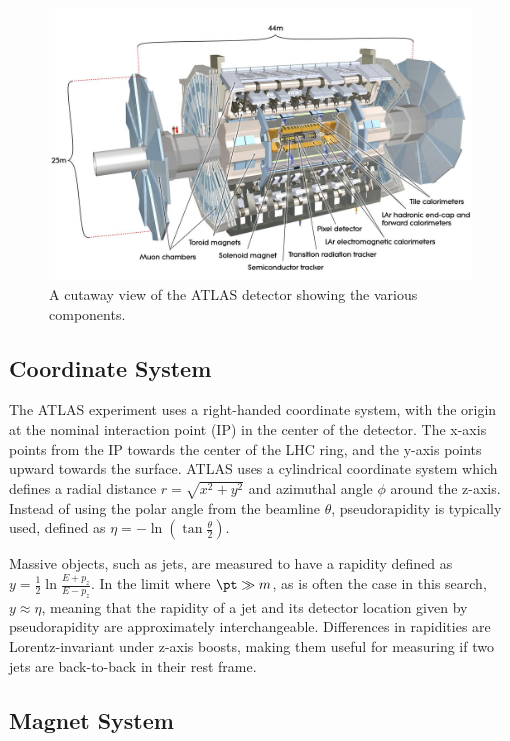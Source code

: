 \begin{figure}[h!]
	\centering
	\includegraphics[width=\columnwidth]{figures/Detector/AtlasDetector.png}
	\caption{A cutaway view of the ATLAS detector showing the various components.\cite{ATLAS}
	}
	\label{fig:AtlasDetector}
\end{figure}
\subsection{Coordinate System}

The ATLAS experiment uses a right-handed coordinate system, with the origin at the nominal interaction point (IP) in the center of the detector.  The x-axis points from the IP towards the center of the LHC ring, and the y-axis points upward towards the surface.  ATLAS uses a cylindrical coordinate system which defines a radial distance $r = \sqrt{x^2+y^2}$ and azimuthal angle $\phi$ around the z-axis.  Instead of using the polar angle from the beamline $\theta$, pseudorapidity is typically used, defined as $\eta = -\ln{(\tan{\frac{\theta}{2}})}$.

Massive objects, such as jets, are measured to have a rapidity defined as $ y = \frac{1}{2}\ln{\frac{E+p_z}{E-p_z}}$.  In the limit where $\pt \gg m$, as is often the case in this search, $y \approx \eta$, meaning that the rapidity of a jet and its detector location given by pseudorapidity are approximately interchangeable.  Differences in rapidities are Lorentz-invariant under z-axis boosts, making them useful for measuring if two jets are back-to-back in their rest frame.

\subsection{Magnet System}

